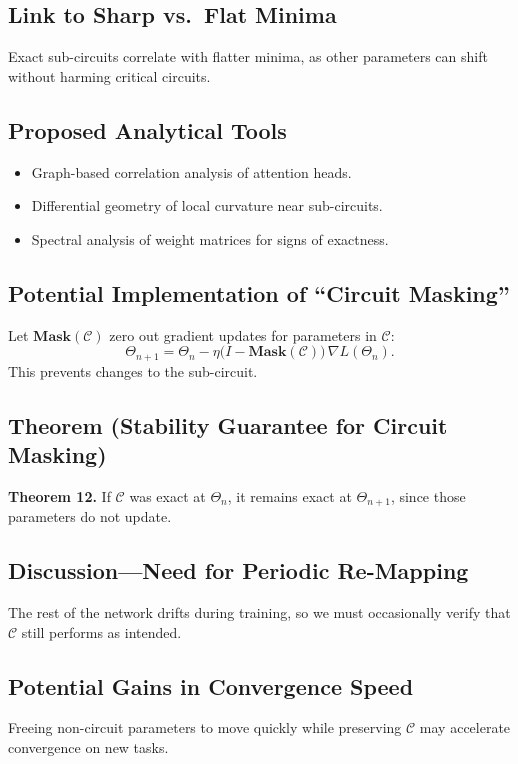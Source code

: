\documentclass{article}
\begin{document}
\subsection{Link to Sharp vs.\ Flat Minima}
Exact sub-circuits correlate with flatter minima, as other parameters can shift without harming critical circuits.

\subsection{Proposed Analytical Tools}
\begin{itemize}
\item Graph-based correlation analysis of attention heads.
\item Differential geometry of local curvature near sub-circuits.
\item Spectral analysis of weight matrices for signs of exactness.
\end{itemize}

\subsection{Potential Implementation of “Circuit Masking”}
Let $\mathbf{Mask}(\mathcal{C})$ zero out gradient updates for parameters in $\mathcal{C}$:
\[
\Theta_{n+1} = \Theta_n - \eta \bigl(I - \mathbf{Mask}(\mathcal{C})\bigr)\,\nabla L(\Theta_n).
\]
This prevents changes to the sub-circuit.

\subsection{Theorem (Stability Guarantee for Circuit Masking)}
\textbf{Theorem 12.}  
If $\mathcal{C}$ was exact at $\Theta_n$, it remains exact at $\Theta_{n+1}$, since those parameters do not update.

\subsection{Discussion—Need for Periodic Re-Mapping}
The rest of the network drifts during training, so we must occasionally verify that $\mathcal{C}$ still performs as intended.

\subsection{Potential Gains in Convergence Speed}
Freeing non-circuit parameters to move quickly while preserving $\mathcal{C}$ may accelerate convergence on new tasks.
\end{document}
